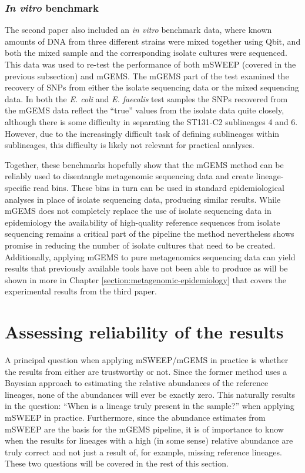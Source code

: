\documentclass[officiallayout]{tktla}
\begin{document}
\subsubsection{\textit{In vitro} benchmark}

The second paper also included an \textit{in vitro} benchmark data,
where known amounts of DNA from three different strains were mixed
together using Qbit, and both the mixed sample and the corresponding
isolate cultures were sequenced. This data was used to re-test the
performance of both mSWEEP (covered in the previous subsection) and
mGEMS. The mGEMS part of the test examined the recovery of SNPs from
either the isolate sequencing data or the mixed sequencing data. In
both the \textit{E. coli} and \textit{E. faecalis} test samples the
SNPs recovered from the mGEMS data reflect the ``true'' values from
the isolate data quite closely, although there is some difficulty in
separating the ST131-C2 sublineages 4 and 6. However, due to the
increasingly difficult task of defining sublineages within
sublineages, this difficulty is likely not relevant for practical
analyses.

Together, these benchmarks hopefully show that the mGEMS method can be
reliably used to disentangle metagenomic sequencing data and create
lineage-specific read bins. These bins in turn can be used in standard
epidemiological analyses in place of isolate sequencing data,
producing similar results. While mGEMS does not completely replace the
use of isolate sequencing data in epidemiology \textemdash the
availability of high-quality reference sequences from isolate
sequencing remains a critical part of the pipeline \textemdash the
method nevertheless shows promise in reducing the number of isolate
cultures that need to be created. Additionally, applying mGEMS to pure
metagenomics sequencing data can yield results that previously
available tools have not been able to produce as will be shown in more
in Chapter \ref{section:metagenomic-epidemiology} that covers the
experimental results from the third paper.

\section{Assessing reliability of the results}

A principal question when applying mSWEEP/mGEMS in practice is whether
the results from either are trustworthy or not. Since the former
method uses a Bayesian approach to estimating the relative abundances
of the reference lineages, none of the abundances will ever be exactly
zero. This naturally results in the question: ``When is a lineage
truly present in the sample?'' when applying mSWEEP in
practice. Furthermore, since the abundance estimates from mSWEEP are
the basis for the mGEMS pipeline, it is of importance to know when the
results for lineages with a high (in some sense) relative abundance
are truly correct and not just a result of, for example, missing
reference lineages. These two questions will be covered in the rest of
this section.
\end{document}

